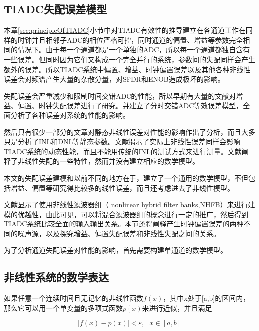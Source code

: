 	\subsection{TIADC失配误差模型}
		
	本章\ref{sec:principleOfTIADC}小节中对TIADC有效性的推导建立在各通道工作在同样的时钟并且相邻子ADC的相位严格可控，同时通道的偏置、增益等参数完全相同的情况下。由于每一个通道都是一个单独的ADC，所以每一个通道都独自含有一些误差。但同时因为它们又构成一个完全并行的系统，参数间的失配同样会产生额外的误差。所以TIADC系统中偏置、增益、时钟偏置误差以及其他各种非线性误差会对频谱产生大量的杂散分量，对SFDR和ENOB造成极坏的影响。\par
	失配误差会严重减少和限制时间交错ADC的性能，所以早期有大量的文献对增益、偏置、时钟失配误差进行了研究。并建立了分时交错ADC等效误差模型，全面分析了各种误差对系统的性能的影响。\par
	然后只有很少一部分的文章对静态非线性误差对性能的影响作出了分析，而且大多只是分析了INL和DNL等静态参数。文献\cite{simoes1997nonlinearity}揭示了实际上非线性误差同样会影响TIADC系统的动态性能，而且不能用传统的INL的测试方式来进行测量。文献\cite{kurosawa2002channel}阐释了非线性失配的一些特性，然而并没有建立相应的数学模型。\par
	本文的失配误差建模和以前不同的地方在于，建立了一个通用的数学模型，不但包括增益、偏置等研究得比较多的线性误差，而且还考虑进去了非线性模型。\par
	文献\cite{vogel2004analysis}显示了使用非线性滤波器组（ nonlinear hybrid filter banks,NHFB）来进行建模的优越性，由此可见，可以将混合滤波器组的概念进行一定的推广，然后得到TIADC系统比较全面的输入输出关系。本节还将阐释产生时钟偏置误差的两种不同的噪声源，以及探究增益、偏置失配误差和非线性失配之间的关系。\par	
	为了分析通道失配误差对性能的影响，首先需要构建单通道的数学模型。\par
	\subsection{非线性系统的数学表达}\label{sec:nonlinearTheory}		
		
		如果任意一个连续时间且无记忆的非线性函数$f(x)$，其中x处于[a,b]的区间内，那么它可以用一个单变量的多项式函数$p(x)$来进行近似，并且满足

			\begin{equation}
				\left| {f\left( x \right) - p\left( x \right)} \right| < \varepsilon ,\,\,\,\,x \in \left[ {a,b} \right]
			\end{equation}
			
